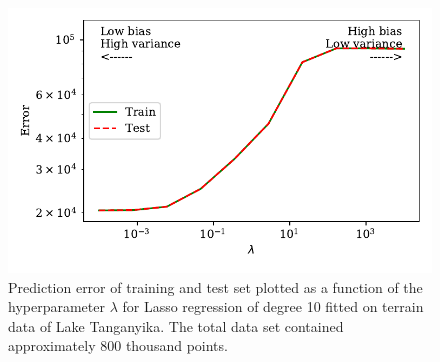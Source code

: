 \documentclass[a4paper, 10pt]{article}
\begin{document}
\begin{figure}[H]
    \includegraphics{figs/biasvariancetradeoff_LASSO_terrain.pdf}
    \caption{Prediction error of training and test set plotted as a function of the hyperparameter $\lambda$ for Lasso regression of degree 10 fitted on terrain data of Lake Tanganyika. The total data set contained approximately 800 thousand points.}
    \label{fig:bias_lasso_terrain}
\end{figure}
\end{document}
